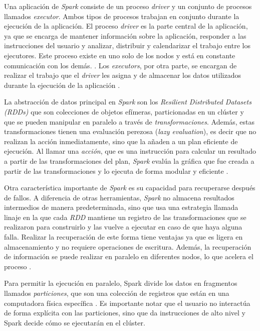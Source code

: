 Una aplicación de \textit{Spark} consiste de un proceso \textit{driver} y un conjunto de procesos llamados \textit{executor}. Ambos tipos de procesos trabajan en conjunto durante la ejecución de la aplicación. El proceso \textit{driver} es la parte central de la aplicación, ya que se encarga de mantener información sobre la aplicación, responder a las instrucciones del usuario y analizar, distribuir y calendarizar el trabajo entre los ejecutores. Este proceso existe en uno solo de los nodos y está en constante comunicación con los demás. \cite{sparkguide}. Los \textit{executors}, por otra parte, se encargan de realizar el trabajo que el \textit{driver} les asigna y de almacenar los datos utilizados durante la ejecución de la aplicación \cite{sparkclusteroverview}.

La abstracción de datos principal en \textit{Spark} son los \textit{Resilient Distributed Datasets (RDDs)} que son colecciones de objetos efímeras, particionadas en un clúster y que se pueden manipular en paralelo a través de \textit{transformaciones}. Además, estas transformaciones tienen una evaluación perezosa (\textit{lazy evaluation}), es decir que no realizan la acción inmediatamente, sino que la añaden a un plan eficiente de ejecución. Al llamar una \textit{acción}, que es una instrucción para calcular un resultado a partir de las transformaciones del plan, \textit{Spark} evalúa la gráfica que fue creada a partir de las transformaciones y lo ejecuta de forma modular y eficiente \cite{sparkberkeley}.

Otra característica importante de \textit{Spark} es su capacidad para recuperarse después de fallos. A diferencia de otras herramientas, \textit{Spark} no almacena resultados intermedios de manera predeterminada, sino que usa una estrategia llamada linaje en la que cada \textit{RDD} mantiene un registro de las transformaciones que se realizaron para construirlo y las vuelve a ejecutar en caso de que haya alguna falla. Realizar la recuperación de este forma tiene ventajas ya que es ligera en almacenamiento y no requiere operaciones de escritura. Además, la recuperación de información se puede realizar en paralelo en diferentes nodos, lo que acelera el proceso \cite{sparkberkeley}.

Para permitir la ejecución en paralelo, Spark divide los datos en fragmentos llamados \textit{particiones}, que son una colección de registros que están en una computadora física específica \cite{sparkguide}. Es importante notar que el usuario no interactúa de forma explícita con las particiones, sino que da instrucciones de alto nivel y Spark decide cómo se ejecutarán en el clúster.

